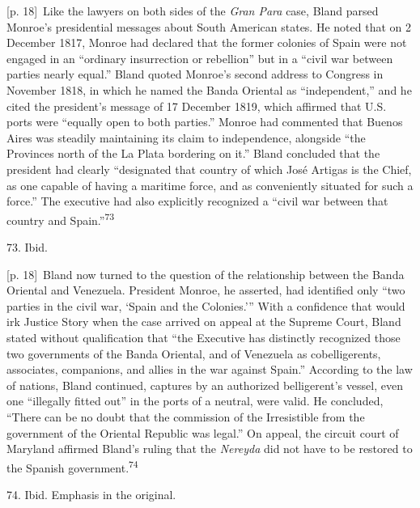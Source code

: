\documentclass[10pt,a4paper]{article}
\begin{document}
{\scriptsize\color{gray} [p. 18]}\ Like the lawyers on both sides of the \textit{Gran Para} case, Bland parsed Monroe’s presidential messages about South American states. He noted that on 2 December 1817, Monroe had declared that the former colonies of Spain were not engaged in an “ordinary insurrection or rebellion” but in a “civil war between parties nearly equal.” Bland quoted Monroe’s second address to Congress in November 1818, in which he named the Banda Oriental as “independent,” and he cited the president’s message of 17 December 1819, which affirmed that U.S. ports were “equally open to both parties.” Monroe had commented that Buenos Aires was steadily maintaining its claim to independence, alongside “the Provinces north of the La Plata bordering on it.” Bland concluded that the president had clearly “designated that country of which José Artigas is the Chief, as one capable of having a maritime force, and as conveniently situated for such a force.” The executive had also explicitly recognized a “civil war between that country and Spain.”\nobreak\textsuperscript{73}\par{\small 73. Ibid.\par}
{\scriptsize\color{gray} [p. 18]}\ Bland now turned to the question of the relationship between the Banda Oriental and Venezuela. President Monroe, he asserted, had identified only “two parties in the civil war, ‘Spain and the Colonies.’” With a confidence that would irk Justice Story when the case arrived on appeal at the Supreme Court, Bland stated without qualification that “the Executive has distinctly recognized those two governments of the Banda Oriental, and of Venezuela as cobelligerents, associates, companions, and allies in the war against Spain.” According to the law of nations, Bland continued, captures by an authorized belligerent’s vessel, even one “illegally fitted out” in the ports of a neutral, were valid. He concluded, “There can be no doubt that the commission of the Irresistible from the government of the Oriental Republic was legal.” On appeal, the circuit court of Maryland affirmed Bland’s ruling that the \textit{Nereyda} did not have to be restored to the Spanish government.\nobreak\textsuperscript{74}\par{\small 74. Ibid. Emphasis in the original.\par}
\end{document}
